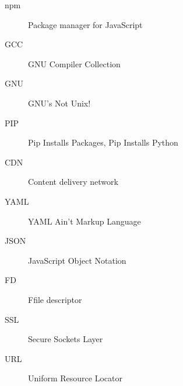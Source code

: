 \begin{description}
  \item[npm] Package manager for JavaScript 
  \item[GCC] GNU Compiler Collection
  \item[GNU] GNU's Not Unix! 
  \item[PIP] Pip Installs Packages, Pip Installs Python
  \item[CDN] Content delivery network
  \item[YAML] YAML Ain't Markup Language
  \item[JSON] JavaScript Object Notation 
  \item[FD] Ffile descriptor
  \item[SSL] Secure Sockets Layer  
  \item[URL] Uniform Resource Locator 
\end{description}